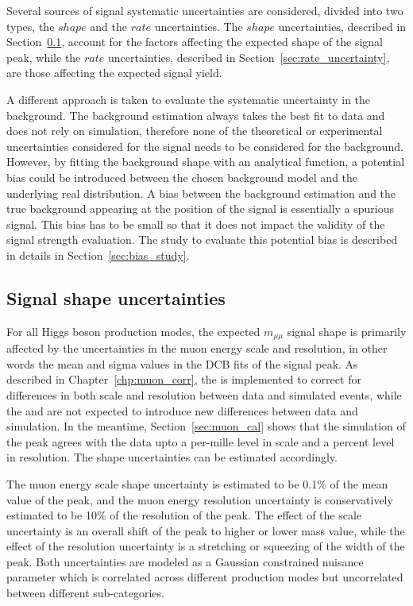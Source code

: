 Several sources of signal systematic uncertainties are considered, divided into two types, the $shape$ and the $rate$ uncertainties.
The $shape$ uncertainties, described in Section~\ref{sec:shape_uncertainty}, account for the factors affecting the expected shape of the signal peak, 
while the $rate$ uncertainties, described in Section~\ref{sec:rate_uncertainty}, are those affecting the expected signal yield.

A different approach is taken to evaluate the systematic uncertainty in the background.
The background estimation always takes the best fit to data and does not rely on simulation,
therefore none of the theoretical or experimental uncertainties considered for the signal needs to be considered for the background.
However, by fitting the background shape with an analytical function, 
a potential bias could be introduced between the chosen background model and the underlying real distribution.
A bias between the background estimation and the true background appearing at the position of the signal is essentially a spurious signal.
This bias has to be small so that it does not impact the validity of the signal strength evaluation.
The study to evaluate this potential bias is described in details in Section~\ref{sec:bias_study}. 

\subsection{Signal shape uncertainties}\label{sec:shape_uncertainty}
For all Higgs boson production modes, the expected $m_{\mu\mu}$ signal shape is primarily affected by the uncertainties in the muon energy scale and resolution,
in other words the mean and sigma values in the DCB fits of the signal peak. 
As described in Chapter~\ref{chp:muon_corr}, the \RochCorr is implemented to correct for differences in both scale and resolution between data and simulated events, 
while the \FSR and \GeoFit are not expected to introduce new differences between data and simulation.
In the meantime, Section~\ref{sec:muon_cal} shows that the simulation of the \DY peak agrees with the data upto a per-mille level in scale and a percent level in resolution.
The shape uncertainties can be estimated accordingly.

The muon energy scale shape uncertainty is estimated to be 0.1\% of the mean value of the \mmm peak, 
and the muon energy resolution uncertainty is conservatively estimated to be 10\% of the resolution of the \mmm peak. 
The effect of the scale uncertainty is an overall shift of the \mmm peak to higher or lower mass value,
while the effect of the resolution uncertainty is a stretching or squeezing of the width of the \mmm peak.
Both uncertainties are modeled as a Gaussian constrained nuisance parameter 
which is correlated across different production modes but uncorrelated between different sub-categories.


